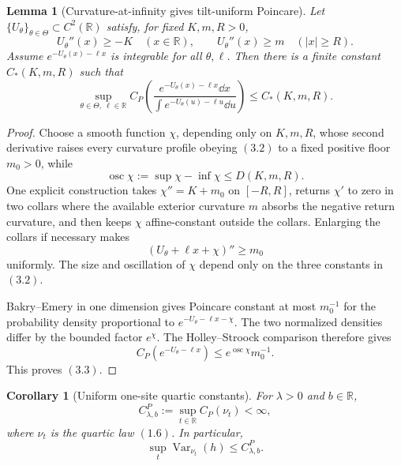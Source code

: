 \documentclass[11pt]{article}
\newtheorem{lemma}[theorem]{Lemma}
\newtheorem{corollary}[theorem]{Corollary}
\theoremstyle{remark}
\begin{document}
\begin{lemma}[Curvature-at-infinity gives tilt-uniform Poincare]
\label{lem:v15v3-curvature-infinity}
Let \(\{U_\theta\}_{\theta\in\Theta}\subset C^2(\mathbb R)\)
satisfy, for fixed \(K,m,R>0\),
\[
 U_\theta''(x)\ge-K\quad(x\in\mathbb R),\qquad
 U_\theta''(x)\ge m\quad(|x|\ge R).                           \tag{3.2}
\]
Assume \(e^{-U_\theta(x)-\ell x}\) is integrable for all
\(\theta,\ell\).  Then there is a finite constant
\(C_*(K,m,R)\) such that
\[
 \sup_{\theta\in\Theta,\ \ell\in\mathbb R}
 C_P\!\left(
 \frac{e^{-U_\theta(x)-\ell x}\dd x}
      {\int e^{-U_\theta(u)-\ell u}\dd u}
 \right)
 \le C_*(K,m,R).                                             \tag{3.3}
\]
\end{lemma}

\begin{proof}
Choose a smooth function \(\chi\), depending only on \(K,m,R\),
whose second derivative raises every curvature profile obeying
\((3.2)\) to a fixed positive floor \(m_0>0\), while
\[
 \operatorname{osc}\chi
 :=\sup\chi-\inf\chi\le D(K,m,R).                             \tag{3.4}
\]
One explicit construction takes \(\chi''=K+m_0\) on
\([-R,R]\), returns \(\chi'\) to zero in two collars where the
available exterior curvature \(m\) absorbs the negative return
curvature, and then keeps \(\chi\) affine-constant outside the
collars.  Enlarging the collars if necessary makes
\[
 (U_\theta+\ell x+\chi)''\ge m_0
\]
uniformly.  The size and oscillation of \(\chi\) depend only on
the three constants in \((3.2)\).

Bakry--Emery in one dimension gives Poincare constant at most
\(m_0^{-1}\) for the probability density proportional to
\(e^{-U_\theta-\ell x-\chi}\).  The two normalized densities
differ by the bounded factor \(e^\chi\).  The
Holley--Stroock comparison therefore gives
\[
 C_P(e^{-U_\theta-\ell x})
 \le e^{\operatorname{osc}\chi}m_0^{-1}.
\]
This proves \((3.3)\).
\end{proof}

\begin{corollary}[Uniform one-site quartic constants]
\label{cor:v15v3-one-site}
For \(\lambda>0\) and \(b\in\mathbb R\),
\[
 C_{\lambda,b}^{P}
 :=\sup_{t\in\mathbb R}C_P(\nu_t)<\infty,                    \tag{3.5}
\]
where \(\nu_t\) is the quartic law \((1.6)\).  In particular,
\[
 \sup_t\operatorname{Var}_{\nu_t}(h)
 \le C_{\lambda,b}^{P}.                                      \tag{3.6}
\]
\end{corollary}
\end{document}
